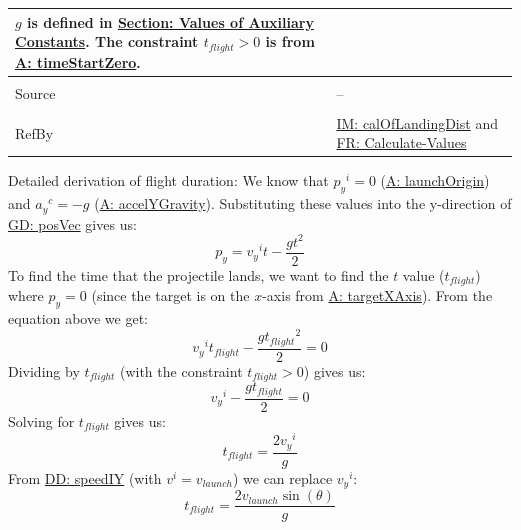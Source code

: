 \documentclass[12pt]{article}
\begin{document}
\begin{minipage}{\textwidth}
\begin{tabular}{>{\raggedright}p{}>{\raggedright\arraybackslash}p{}}
        $g$ is defined in \hyperref[Sec:AuxConstants]{Section: Values of Auxiliary Constants}.
        The constraint ${t_{flight}}>0$ is from \hyperref[timeStartZero]{A: timeStartZero}.
\\ \midrule \\
Source & --
\\ \midrule \\
RefBy & \hyperref[IM:calOfLandingDist]{IM: calOfLandingDist} and \hyperref[calcValues]{FR: Calculate-Values}
\\ \bottomrule \end{tabular}
\end{minipage}
Detailed derivation of flight duration:
We know that ${{p_{y}}^{i}}=0$ (\hyperref[launchOrigin]{A: launchOrigin}) and ${{a_{y}}^{c}}=-g$ (\hyperref[accelYGravity]{A: accelYGravity}). Substituting these values into the y-direction of \hyperref[GD:posVec]{GD: posVec} gives us:
\begin{displaymath}
{p_{y}}={{v_{y}}^{i}} t-\frac{g t^{2}}{2}
\end{displaymath}
To find the time that the projectile lands, we want to find the $t$ value (${t_{flight}}$) where ${p_{y}}=0$ (since the target is on the $x$-axis from \hyperref[targetXAxis]{A: targetXAxis}). From the equation above we get:
\begin{displaymath}
{{v_{y}}^{i}} {t_{flight}}-\frac{g {t_{flight}}^{2}}{2}=0
\end{displaymath}
Dividing by ${t_{flight}}$ (with the constraint ${t_{flight}}>0$) gives us:
\begin{displaymath}
{{v_{y}}^{i}}-\frac{g {t_{flight}}}{2}=0
\end{displaymath}
Solving for ${t_{flight}}$ gives us:
\begin{displaymath}
{t_{flight}}=\frac{2 {{v_{y}}^{i}}}{g}
\end{displaymath}
From \hyperref[DD:speedIY]{DD: speedIY} (with ${v^{i}}={v_{launch}}$) we can replace ${{v_{y}}^{i}}$:
\begin{displaymath}
{t_{flight}}=\frac{2 {v_{launch}} \sin\left(θ\right)}{g}
\end{displaymath}
\par~
\end{document}
